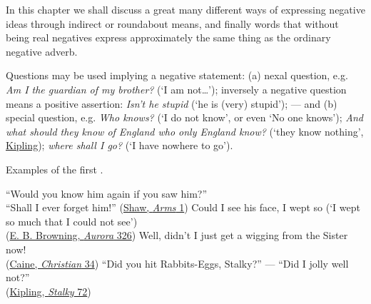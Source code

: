 \label{ch:4}

In this chapter we shall discuss a great many different ways of expressing negative ideas through indirect or roundabout means, and finally words that without being real negatives express approximately the same thing as the ordinary negative adverb.

 \label{sec:indirect-negation}

 \label{sec:questions}

Questions may be used implying a negative statement: (a) nexal question, e.g. \textit{Am I the guardian of my brother?} (`I am not\dots'); inversely a negative question means a positive assertion: \textit{Isn't he stupid} (`he is (very) stupid'); --- and (b) special question, e.g. \textit{Who knows?} (`I do not know', or even `No one knows'); \textit{And what should they know of England who only England know?} (`they know nothing', \href{https://archive.org/details/in.ernet.dli.2015.48402/page/n193/mode/2up?q=\%22know+of+england\%22&view=theater}{Kipling}); \textit{where shall I go?} (`I have nowhere to go').
 
 Examples of the first .

\ea \label{ex:04-01}
\ea
``Would you know him again if you saw him?''\\``Shall I ever forget him!''
\hfill(\href{https://archive.org/details/in.ernet.dli.2015.469714/page/n33/mode/2up?q=\%22Shall+I+ever+forget+him%21\%22&view=theater}{Shaw, \textit{Arms} 1})
\ex
Could I see his face, I wept so \phantom{x} (`I wept so much that I could not see')\\
\hfill(\href{https://archive.org/details/auroraleighpoem00brow/page/358/mode/2up?q=\%22Could+I+see+his+face%2C+I+wept+so\%22&view=theater}{E. B. Browning, \textit{Aurora} 326})
\ex
Well, didn't I just get a wigging from the Sister now!\\\hfill(\href{https://archive.org/details/christianstory00cainrich/page/40/mode/2up?q=\%22get+a+wigging\%22&view=theater}{Caine, \textit{Christian} 34})
\ex
``Did you hit Rabbits-Eggs, Stalky?'' --- ``Did I jolly well not?''\\\hfill(\href{https://archive.org/details/stalkyandco015455mbp/page/n69/mode/2up?q=\%22hit+Rabbits-Eggs\%22&view=theater}{Kipling, \textit{Stalky} 72}) %
\z
\z

